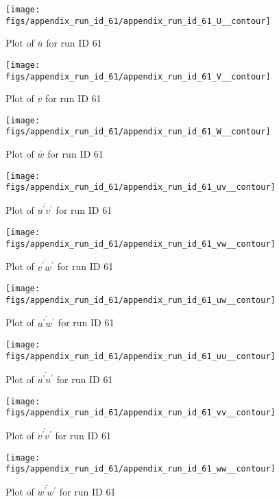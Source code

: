 \begin{figure}[H]
\centering
\texttt{[image: figs/appendix\_run\_id\_61/appendix\_run\_id\_61\_U\_\_contour]}
\caption{Plot of $\overline{u}$ for run ID 61}
\label{fig:appendix_run_id_61_U__contour}
\end{figure}


\begin{figure}[H]
\centering
\texttt{[image: figs/appendix\_run\_id\_61/appendix\_run\_id\_61\_V\_\_contour]}
\caption{Plot of $\overline{v}$ for run ID 61}
\label{fig:appendix_run_id_61_V__contour}
\end{figure}


\begin{figure}[H]
\centering
\texttt{[image: figs/appendix\_run\_id\_61/appendix\_run\_id\_61\_W\_\_contour]}
\caption{Plot of $\overline{w}$ for run ID 61}
\label{fig:appendix_run_id_61_W__contour}
\end{figure}


\begin{figure}[H]
\centering
\texttt{[image: figs/appendix\_run\_id\_61/appendix\_run\_id\_61\_uv\_\_contour]}
\caption{Plot of $\overline{u^\prime v^\prime}$ for run ID 61}
\label{fig:appendix_run_id_61_uv__contour}
\end{figure}


\begin{figure}[H]
\centering
\texttt{[image: figs/appendix\_run\_id\_61/appendix\_run\_id\_61\_vw\_\_contour]}
\caption{Plot of $\overline{v^\prime w^\prime}$ for run ID 61}
\label{fig:appendix_run_id_61_vw__contour}
\end{figure}


\begin{figure}[H]
\centering
\texttt{[image: figs/appendix\_run\_id\_61/appendix\_run\_id\_61\_uw\_\_contour]}
\caption{Plot of $\overline{u^\prime w^\prime}$ for run ID 61}
\label{fig:appendix_run_id_61_uw__contour}
\end{figure}


\begin{figure}[H]
\centering
\texttt{[image: figs/appendix\_run\_id\_61/appendix\_run\_id\_61\_uu\_\_contour]}
\caption{Plot of $\overline{u^\prime u^\prime}$ for run ID 61}
\label{fig:appendix_run_id_61_uu__contour}
\end{figure}


\begin{figure}[H]
\centering
\texttt{[image: figs/appendix\_run\_id\_61/appendix\_run\_id\_61\_vv\_\_contour]}
\caption{Plot of $\overline{v^\prime v^\prime}$ for run ID 61}
\label{fig:appendix_run_id_61_vv__contour}
\end{figure}


\begin{figure}[H]
\centering
\texttt{[image: figs/appendix\_run\_id\_61/appendix\_run\_id\_61\_ww\_\_contour]}
\caption{Plot of $\overline{w^\prime w^\prime}$ for run ID 61}
\label{fig:appendix_run_id_61_ww__contour}
\end{figure}


